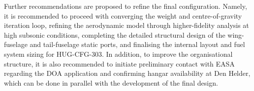 Further recommendations are proposed to refine the final configuration. Namely, it is recommended to proceed with converging the weight and centre-of-gravity iteration loop, refining the aerodynamic model through higher-fidelity analysis at high subsonic conditions, completing the detailed structural design of the wing-fuselage and tail-fuselage static ports, and finalising the internal layout and fuel system sizing for HUG-CFG-303. In addition, to improve the organisational structure, it is also recommended to initiate preliminary contact with EASA regarding the DOA application and confirming hangar availability at Den Helder, which can be done in parallel with the development of the final design.